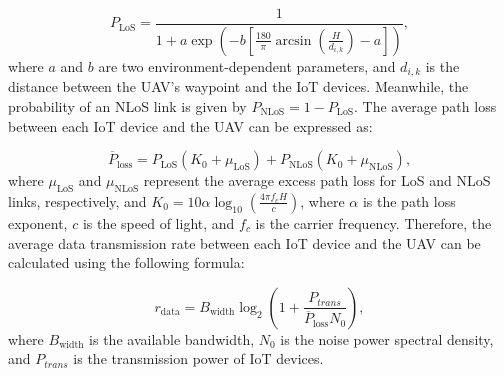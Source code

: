 \documentclass[sigconf]{acmart}
\begin{document}
\begin{equation}
    P_{\text{LoS}}=\frac{1}{1+a\exp\left(-b\left[\frac{180}{\pi}\arcsin\left(\frac{H}{d_{i,k}}\right)-a\right]\right)},
\end{equation}
where $a$ and $b$ are two environment-dependent parameters, and $d_{i,k}$ is the distance between the UAV's waypoint and the IoT devices. Meanwhile, the probability of an NLoS link is given by $P_{\text{NLoS}} = 1 - P_{\text{LoS}}$. The average path loss between each IoT device and the UAV can be expressed as:

\begin{equation}
    \overline{P}_{\mathrm{loss}}=P_{\mathrm{LoS}}\left(K_0+\mu_{\mathrm{LoS}}\right)+P_{\mathrm{NLoS}}\left(K_0+\mu_{\mathrm{NLoS}}\right),
\end{equation}
where $\mu_{\mathrm{LoS}}$ and $\mu_{\mathrm{NLoS}}$ represent the average excess path loss for LoS and NLoS links, respectively, and $K_0=10\alpha\log_{10}(\frac{4\pi f_{c}H}{c})$, where $\alpha$ is the path loss exponent, $c$ is the speed of light, and $f_{c}$ is the carrier frequency. Therefore, the average data transmission rate between each IoT device and the UAV can be calculated using the following formula:

\begin{equation}
    r_{\mathrm{data}}=B_{\mathrm{width}}\log_2\left(1+\frac{P_{trans}}{\overline{P}_{\mathrm{loss}}N_0}\right),
\end{equation}
where $B_{\mathrm{width}}$ is the available bandwidth, $N_0$ is the noise power spectral density, and $P_{trans}$ is the transmission power of IoT devices.
\end{document}
